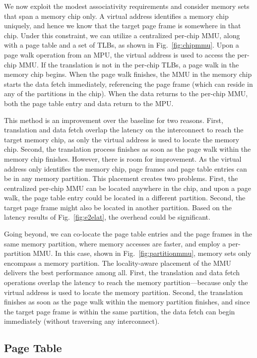 We now exploit the modest associativity requirements and consider memory sets that span a memory chip only. A virtual address identifies a memory chip uniquely, and hence we know that the target page frame is somewhere in that chip. Under this constraint, we can utilize a centralized per-chip MMU, along with a page table and a set of TLBs, as shown in Fig.~\ref{fig:chipmmu}. Upon a page walk operation from an MPU, the virtual address is used to access the per-chip MMU. If the translation is not in the per-chip TLBs, a page walk in the memory chip begins. When the page walk finishes, the MMU in the memory chip starts the data fetch immediately, referencing the page frame (which can reside in any of the partitions in the chip). When the data returns to the per-chip MMU, both the page table entry and data return to the MPU. 

This method is an improvement over the baseline for two reasons. First, translation and data fetch overlap the latency on the interconnect to reach the target memory chip, as only the virtual address is used to locate the memory chip. Second, the translation process finishes as soon as the page walk within the memory chip finishes. However, there is room for improvement. As the virtual address only identifies the memory chip, page frames and page table entries can be in any memory partition. This placement creates two problems. First, the centralized per-chip MMU can be located anywhere in the chip, and upon a page walk, the page table entry could be located in a different partition. Second, the target page frame might also be located in another partition. Based on the latency results of Fig.~\ref{fig:e2elat}, the overhead could be significant. 

Going beyond, we can co-locate the page table entries and the page frames in the same memory partition, where memory accesses are faster, and employ a per-partition MMU. In this case, shown in Fig.~\ref{fig:partitionmmu}, memory sets only encompass a memory partition. The locality-aware placement of the MMU delivers the best performance among all. First, the translation and data fetch operations overlap the latency to reach the memory partition---because only the virtual address is used to locate the memory partition. Second, the translation finishes as soon as the page walk within the memory partition finishes, and since the target page frame is within the same partition, the data fetch can begin immediately (without traversing any interconnect).

\subsection{Page Table}
\label{sec:pagetable}

